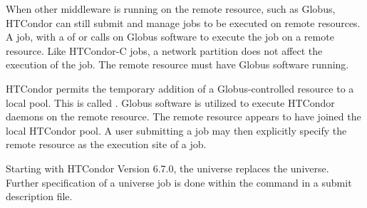 When other middleware is running on the remote resource,
such as Globus,
HTCondor can still submit and manage jobs to be executed on
remote resources.
A   job,
with a  of
 or 
calls on Globus software to execute the job on a remote resource.
Like HTCondor-C jobs, a network partition does not affect
the execution of the job.
The remote resource must have Globus software running.

HTCondor permits the temporary addition of a
Globus-controlled resource to a local pool.
This is called .
Globus software is utilized to execute HTCondor daemons on the
remote resource.
The remote resource appears to have joined the local HTCondor pool.
A user submitting a job may then explicitly specify the
remote resource as the execution site of a job.

Starting with HTCondor Version 6.7.0, the  universe
replaces the  universe.
Further specification of a  universe job is done
within the  command in a submit description file.
